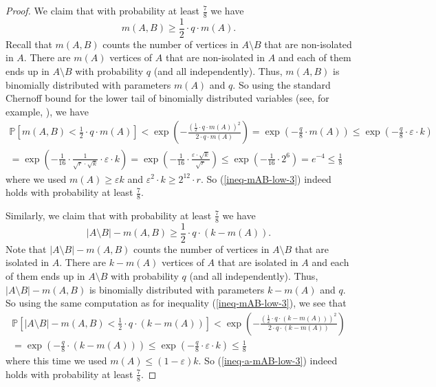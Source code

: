 \begin{proof}
We claim that with probability at least $\frac{7}{8}$ we have
\begin{equation}\label{ineq-mAB-low-3}
m(A,B)\geq \frac{1}{2}\cdot q \cdot m(A).
\end{equation}
Recall that $m(A,B)$ counts the number of vertices in $A\setminus B$ that are non-isolated in $A$. There are $m(A)$ vertices of $A$ that are non-isolated in $A$ and each of them ends up in $A\setminus B$ with probability $q$ (and all independently). Thus, $m(A,B)$ is binomially distributed with parameters $m(A)$ and $q$. So using the standard Chernoff bound for the lower tail of binomially distributed variables (see, for example, \cite[Theorem A.1.13]{alon-spencer}), we have 
\begin{multline*}
\mathbb{P}\left[m(A,B)< \frac{1}{2}\cdot q \cdot m(A)\right]<\exp\left(-\frac{\left(\frac{1}{2}\cdot q \cdot m(A)\right)^2}{2\cdot q\cdot m(A)}\right)=\exp\left(-\frac{q}{8}\cdot m(A)\right)\leq \exp\left(-\frac{q}{8}\cdot \varepsilon\cdot k\right)\\
=\exp\left(-\frac{1}{16}\cdot \frac{1}{\sqrt{r}\cdot \sqrt{k}}\cdot \varepsilon\cdot k\right)=\exp\left(-\frac{1}{16}\cdot \frac{\varepsilon\cdot \sqrt{k}}{\sqrt{r}}\right)\leq \exp\left(-\frac{1}{16}\cdot 2^6\right)= e^{-4}\leq \frac{1}{8}
\end{multline*}
where we used $m(A)\geq \varepsilon k$ and $\varepsilon^2\cdot k\geq 2^{12} \cdot r$. So (\ref{ineq-mAB-low-3}) indeed holds with probability at least $\frac{7}{8}$.

Similarly, we claim that with probability at least $\frac{7}{8}$ we have
\begin{equation}\label{ineq-a-mAB-low-3}
\vert A\setminus B\vert-m(A,B)\geq \frac{1}{2}\cdot q \cdot (k-m(A)).
\end{equation}
Note that $\vert A\setminus B\vert-m(A,B)$ counts the number of vertices in $A\setminus B$ that are isolated in $A$. There are $k-m(A)$ vertices of $A$ that are isolated in $A$ and each of them ends up in $A\setminus B$ with probability $q$ (and all independently). Thus, $\vert A\setminus B\vert-m(A,B)$ is binomially distributed with parameters $k-m(A)$ and $q$. So using the same computation as for inequality (\ref{ineq-mAB-low-3}), we see that
\begin{multline*}
\mathbb{P}\left[\vert A\setminus B\vert-m(A,B)< \frac{1}{2}\cdot q \cdot (k-m(A))\right]<\exp\left(-\frac{\left(\frac{1}{2}\cdot q \cdot (k-m(A))\right)^2}{2\cdot q\cdot (k-m(A))}\right)\\
=\exp\left(-\frac{q}{8}\cdot (k-m(A))\right)\leq \exp\left(-\frac{q}{8}\cdot \varepsilon\cdot k\right)\leq \frac{1}{8}
\end{multline*}
where this time we used $m(A)\leq (1-\varepsilon) k$. So (\ref{ineq-a-mAB-low-3}) indeed holds with probability at least $\frac{7}{8}$.


\end{proof}
